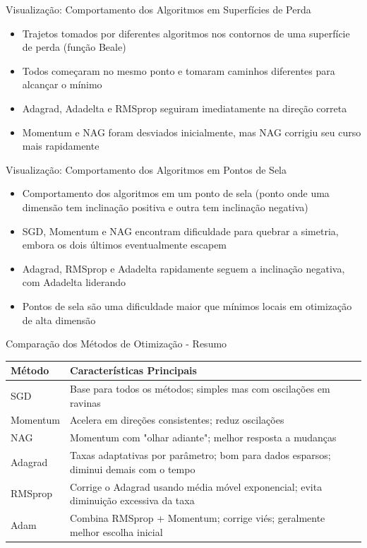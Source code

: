 \documentclass[aspectratio=1610]{beamer}
\begin{document}
\begin{frame}{Visualização: Comportamento dos Algoritmos em Superfícies de Perda}
\begin{itemize}
    \item Trajetos tomados por diferentes algoritmos nos contornos de uma superfície de perda (função Beale)
    \item Todos começaram no mesmo ponto e tomaram caminhos diferentes para alcançar o mínimo
    \item Adagrad, Adadelta e RMSprop seguiram imediatamente na direção correta
    \item Momentum e NAG foram desviados inicialmente, mas NAG corrigiu seu curso mais rapidamente
\end{itemize}
\end{frame}

\begin{frame}{Visualização: Comportamento dos Algoritmos em Pontos de Sela}
\begin{itemize}
    \item Comportamento dos algoritmos em um ponto de sela (ponto onde uma dimensão tem inclinação positiva e outra tem inclinação negativa)
    \item SGD, Momentum e NAG encontram dificuldade para quebrar a simetria, embora os dois últimos eventualmente escapem
    \item Adagrad, RMSprop e Adadelta rapidamente seguem a inclinação negativa, com Adadelta liderando
    \item Pontos de sela são uma dificuldade maior que mínimos locais em otimização de alta dimensão
\end{itemize}
\end{frame}

\begin{frame}{Comparação dos Métodos de Otimização - Resumo}
\small
\begin{tabular}{|p{2.2cm}|p{8cm}|}
\hline
\textbf{Método} & \textbf{Características Principais} \\
\hline
SGD & Base para todos os métodos; simples mas com oscilações em ravinas \\
\hline
Momentum & Acelera em direções consistentes; reduz oscilações \\
\hline
NAG & Momentum com "olhar adiante"; melhor resposta a mudanças \\
\hline
Adagrad & Taxas adaptativas por parâmetro; bom para dados esparsos; diminui demais com o tempo \\
\hline
RMSprop & Corrige o Adagrad usando média móvel exponencial; evita diminuição excessiva da taxa \\
\hline
Adam & Combina RMSprop + Momentum; corrige viés; geralmente melhor escolha inicial \\
\hline
\end{tabular}
\end{frame}
\end{document}
